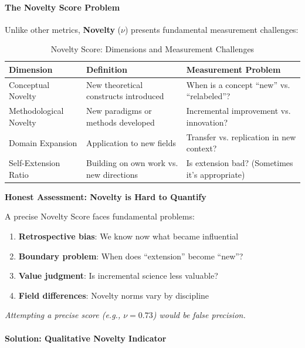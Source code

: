 \documentclass[11pt,a4paper]{article}
\begin{document}
\paragraph{The Novelty Score Problem}

Unlike other metrics, \textbf{Novelty} ($\nu$) presents fundamental measurement challenges:

\begin{table}[h]
\centering
\caption{Novelty Score: Dimensions and Measurement Challenges}
\begin{tabular}{p{3cm}p{4cm}p{4.5cm}}
\toprule
\textbf{Dimension} & \textbf{Definition} & \textbf{Measurement Problem} \\
\midrule
Conceptual Novelty & New theoretical constructs introduced & When is a concept ``new'' vs. ``relabeled''? \\
\addlinespace
Methodological Novelty & New paradigms or methods developed & Incremental improvement vs. innovation? \\
\addlinespace
Domain Expansion & Application to new fields & Transfer vs. replication in new context? \\
\addlinespace
Self-Extension Ratio & Building on own work vs. new directions & Is extension bad? (Sometimes it's appropriate) \\
\bottomrule
\end{tabular}
\end{table}

\begin{warningbox}
\textbf{Honest Assessment: Novelty is Hard to Quantify}

A precise Novelty Score faces fundamental problems:
\begin{enumerate}
    \item \textbf{Retrospective bias}: We know now what became influential
    \item \textbf{Boundary problem}: When does ``extension'' become ``new''?
    \item \textbf{Value judgment}: Is incremental science less valuable?
    \item \textbf{Field differences}: Novelty norms vary by discipline
\end{enumerate}

\textit{Attempting a precise score (e.g., $\nu = 0.73$) would be false precision.}
\end{warningbox}

\paragraph{Solution: Qualitative Novelty Indicator}
\end{document}
